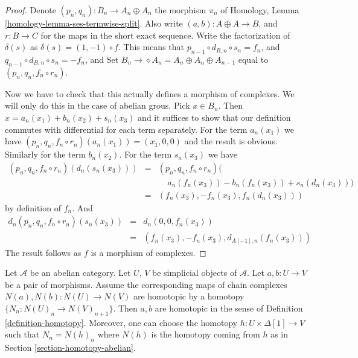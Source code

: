 \begin{proof}
Denote $(p_n, q_n) : B_n \to A_n \oplus A_n$ the morphism $\pi_n$
of Homology, Lemma \ref{homology-lemma-ses-termwise-split}.
Also write $(a, b) : A \oplus A \to B$, and
$r : B \to C$ for the maps in the short exact sequence.
Write the factorization of $\delta(s)$ as
$\delta(s) = (1, -1) \circ f$. This means that
$p_{n - 1} \circ d_{B, n} \circ s_n = f_n$, and
$q_{n - 1} \circ d_{B, n} \circ s_n = - f_n$, and
Set $B_n \to \diamond A_n = A_n \oplus A_n \oplus A_{n - 1}$
equal to $(p_n, q_n, f_n \circ r_n)$.

\medskip\noindent
Now we have to check that this actually defines a morphism
of complexes. We will only do this in the case of abelian grous.
Pick $x \in B_n$. Then $x = a_n(x_1) + b_n(x_2) + s_n(x_3)$
and it suffices to show that our definition commutes
with differential for each term separately. For the term
$a_n(x_1)$ we have $(p_n, q_n, f_n \circ r_n)(a_n(x_1)) =
(x_1, 0, 0)$ and the result is obvious. Similarly for
the term $b_n(x_2)$. For the term $s_n(x_3)$ we have
\begin{eqnarray*}
(p_n, q_n, f_n \circ r_n)(d_n(s_n(x_3))) & = &
(p_n, q_n, f_n \circ r_n)( \\
& & \ \ \ \ \ a_n(f_n(x_3)) - b_n(f_n(x_3)) + s_n(d_n(x_3))) \\
& = &
(f_n(x_3), -f_n(x_3), f_n(d_n(x_3)))
\end{eqnarray*}
by definition of $f_n$. And
\begin{eqnarray*}
d_n(p_n, q_n, f_n \circ r_n)(s_n(x_3)) & = & d_n(0, 0, f_n(x_3)) \\
& = &
(f_n(x_3), - f_n(x_3), d_{A[-1], n}(f_n(x_3)))
\end{eqnarray*}
The result follows as $f$ is a morphism of complexes.
\end{proof}

\begin{lemma}
\label{lemma-backwards-homotopy}
Let $\mathcal{A}$ be an abelian category.
Let $U$, $V$ be simplicial objects of $\mathcal{A}$.
Let $a, b : U \to V$ be a pair of morphisms.
Assume the corresponding maps of chain complexes
$N(a), N(b) : N(U) \to N(V)$ are homotopic by
a homotopy $\{N_n : N(U)_n \to N(V)_{n + 1}\}$.
Then $a, b$ are homotopic in the sense of
Definition \ref{definition-homotopy}. Moreover, one can choose the
homotopy $h : U \times \Delta[1] \to V$ such that
$N_n = N(h)_n$ where $N(h)$ is the homotopy coming
from $h$ as in Section \ref{section-homotopy-abelian}.
\end{lemma}

